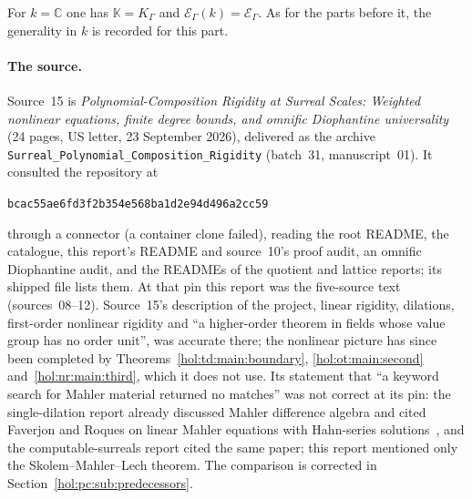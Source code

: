 \documentclass[11pt]{article}
\numberwithin{equation}{section}
\theoremstyle{definition}
\theoremstyle{remark}
\newcommand{\C}{\mathbb C}
\newcommand{\K}{K_\Gamma}
\newcommand{\E}{\mathcal E_\Gamma}
\newcommand{\KK}{\mathbb K}
\newcommand{\EK}{\mathcal E_\Gamma(k)}
\begin{document}
For $k=\C$ one has $\KK=\K$ and $\EK=\E$. As for the parts before it, the
generality in $k$ is recorded for this part.

\paragraph{The source.}
Source~15 is \emph{Polynomial-Composition Rigidity at Surreal Scales: Weighted
nonlinear equations, finite degree bounds, and omnific Diophantine
universality} (24 pages, US letter, 23 September 2026), delivered as the
archive \texttt{Surreal\_Polynomial\_Composition\_Rigidity} (batch~31,
manuscript~01). It consulted the repository at
\begin{center}\small\texttt{bcac55ae6fd3f2b354e568ba1d2e94d496a2cc59}\end{center}
through a connector (a container clone failed), reading the root README, the
catalogue, this report's README and source~10's proof audit, an omnific
Diophantine audit, and the READMEs of the quotient and lattice reports; its
shipped file  lists them. At
that pin this report was the five-source text (sources~08--12). Source~15's
description of the project, linear rigidity, dilations, first-order nonlinear
rigidity and ``a higher-order theorem in fields whose value group has no order
unit'', was accurate there; the nonlinear picture has since been completed by
Theorems~\ref{hol:td:main:boundary}, \ref{hol:ot:main:second}
and~\ref{hol:nr:main:third}, which it does not use. Its statement that ``a
keyword search for Mahler material returned no matches'' was not correct at its
pin: the single-dilation report already discussed Mahler difference algebra
and cited Faverjon and Roques on linear Mahler equations with Hahn-series
solutions~\cite{faverjonroques,reposdhs}, and the computable-surreals report
cited the same paper; this report mentioned only the Skolem--Mahler--Lech
theorem. The comparison is corrected in Section~\ref{hol:pc:sub:predecessors}.
\end{document}
